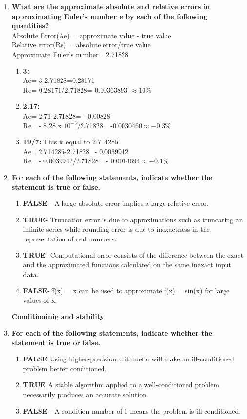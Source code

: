 \documentclass[12pt, oneside]{article}   	%
\begin{document}
\begin{enumerate}
	\item \textbf{ What are the approximate absolute and relative errors in approximating Euler’s number e by each of the following quantities? }\\
	
	Absolute Error(Ae) = approximate value - true value\\
	Relative error(Re) = absolute error/true value\\
	Approximate Euler's number= 2.71828
	\begin{enumerate}
		\item \textbf{3:}\\
		Ae= 3-2.71828=0.28171\\
		Re= 0.28171/2.71828= 0.10363893 $\approx 10 \%$
		\item \textbf{2.17:}\\
		Ae= 2.71-2.71828= - 0.00828 \\
		Re= - 8.28 x $10^{-3}$/2.71828= -0.0030460$\approx -0.3 \%$
		\item \textbf{19/7:} This is equal to 2.714285\\
		Ae= 2.714285-2.71828=- 0.0039942\\
		Re= - 0.0039942/2.71828= - 0.0014694$\approx -0.1 \%$
	\end{enumerate}

\hspace{3cm}
	\item \textbf{For each of the following statements, indicate whether the statement is true or false.}
	\begin{enumerate}
		\item \textbf{FALSE} -
		A large absolute error implies a large relative error. 
		\item \textbf{TRUE}-  Truncation error is due to approximations such as truncating an infinite series while rounding error is due to inexactness in the representation of real numbers. 
		\item \textbf{TRUE}- Computational error consists of the difference between the exact and the approximated functions calculated on the same inexact input data.
		\item \textbf{FALSE}- \^f(x) = x can be used to approximate f(x) = sin(x) for large values of x.
	\end{enumerate}
\newpage
\textbf{ \Large Conditioninig and stability}\\
      \item \textbf{For each of the following statements, indicate whether the statement is true or false.}
      	\begin{enumerate}
      	\item \textbf{FALSE}
      	Using higher-precision arithmetic will make an ill-conditioned problem better conditioned.  
      	\item \textbf{TRUE} A stable algorithm applied to a well-conditioned problem necessarily produces an accurate solution. 
      	\item \textbf{FALSE} - A condition number of 1 means the problem is ill-conditioned.   
      	

\end{enumerate}
\end{enumerate}
\end{document}
